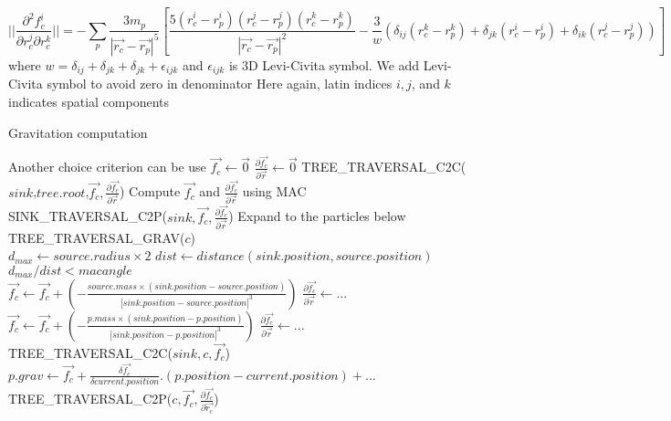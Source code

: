 \documentclass{article}
\begin{document}
\begin{equation}
||\frac{\partial^2 f_c^i}{\partial r_c^j \partial r_c^k}|| =
- \sum_p \frac{3 m_p}{|\vec{r_c}-\vec{r_p}|^5} \left[\frac{5(r_c^i-r_p^i)(r_c^j-r_p^j)(r_c^k-r_p^k)}{|\vec{r_c}-\vec{r_p}|^2} - \frac{3}{w} \left( \delta_{ij} (r_c^k-r_p^k)+\delta_{jk} (r_c^i-r_p^i)+\delta_{ik} (r_c^j-r_p^j) \right) \right]
 \end{equation}
where $w = \delta_{ij} + \delta_{jk} + \delta_{jk} + \epsilon_{ijk}$ and $\epsilon_{ijk}$ is 3D Levi-Civita symbol. We add Levi-Civita symbol to avoid zero in denominator
Here again, latin indices $i,j$, and $k$ indicates spatial components

\begin{algorithm}
\caption{Gravitation computation}\label{comp_grav}
\begin{algorithmic}[1]
\Comment Another choice criterion can be use
	\State $\vec{f_c} \leftarrow \vec{0}$
	\State $\frac{\partial \vec{f_c}}{\partial \vec{r}} \leftarrow \vec{0}$
	\State TREE\_TRAVERSAL\_C2C($sink$,$tree.root$,$\vec{f_c},\frac{\partial \vec{f_c}}{\partial \vec{r}}$)
	\Comment Compute $\vec{f_c}$ and $\frac{\partial \vec{f_c}}{\partial \vec{r}}$ using MAC
	\State SINK\_TRAVERSAL\_C2P($sink,\vec{f_c},\frac{\partial \vec{f_c}}{\partial \vec{r}}$)
	\Comment Expand to the particles below
\Else
{}
	\State TREE\_TRAVERSAL\_GRAV($c$)
\EndFor
\EndIf
\EndProcedure
\\
\State $d_{max} \leftarrow source.radius\times 2 $
\State $dist \leftarrow distance(sink.position,source.position)$
\State \Return $d_{max}/dist < macangle$
\EndFunction
\\
	\State $\vec{f_c} \leftarrow \vec{f_c} + (- \frac{source.mass\times (sink.position - source.position) }{ |sink.position - source.position|^3} )$
	\State $ \frac{\partial \vec{f_c}}{\partial \vec{r}} \leftarrow ... $
\Else
{}
	\State $\vec{f_c} \leftarrow \vec{f_c} + (- \frac{p.mass\times (sink.position - p.position) }{ |sink.position - p.position|^3} )$
	\State $ \frac{\partial \vec{f_c}}{\partial \vec{r}} \leftarrow ... $
\EndFor
\Else
	\State TREE\_TRAVERSAL\_C2C($sink,c,\vec{f_c}$)
\EndFor
\EndIf
\EndIf
\EndProcedure
\\
		\State $p.grav \leftarrow \vec{f_c}+\frac{\delta \vec{f_c}}{\delta current.position}.(p.position-current.position) + ...$
	\EndFor
\Else
		\State TREE\_TRAVERSAL\_C2P($ c, \vec{f_c}, \frac{\partial \vec{f_c}}{\partial \vec{r_c}}$)
	\EndFor
\EndIf
\EndProcedure
\end{algorithmic}
\end{algorithm}


\nocite{*}



\newpage
\appendix
\end{document}
